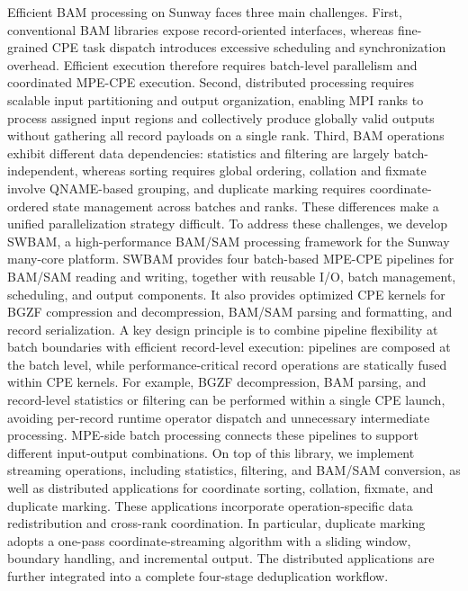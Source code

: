 \documentclass[lettersize,journal]{IEEEtran}
\begin{document}
Efficient BAM processing on Sunway faces three main challenges.
First, conventional BAM libraries expose record-oriented interfaces, whereas fine-grained CPE task dispatch introduces excessive scheduling and synchronization overhead. Efficient execution therefore requires batch-level parallelism and coordinated MPE-CPE execution.
Second, distributed processing requires scalable input partitioning and output organization, enabling MPI ranks to process assigned input regions and collectively produce globally valid outputs without gathering all record payloads on a single rank.
Third, BAM operations exhibit different data dependencies: statistics and filtering are largely batch-independent, whereas sorting requires global ordering, collation and fixmate involve QNAME-based grouping, and duplicate marking requires coordinate-ordered state management across batches and ranks.
These differences make a unified parallelization strategy difficult.
To address these challenges, we develop SWBAM, a high-performance BAM/SAM processing framework for the Sunway many-core platform.
SWBAM provides four batch-based MPE-CPE pipelines for BAM/SAM reading and writing, together with reusable I/O, batch management, scheduling, and output components.
It also provides optimized CPE kernels for BGZF compression and decompression, BAM/SAM parsing and formatting, and record serialization.
A key design principle is to combine pipeline flexibility at batch boundaries with efficient record-level execution: pipelines are composed at the batch level, while performance-critical record operations are statically fused within CPE kernels.
For example, BGZF decompression, BAM parsing, and record-level statistics or filtering can be performed within a single CPE launch, avoiding per-record runtime operator dispatch and unnecessary intermediate processing.
MPE-side batch processing connects these pipelines to support different input-output combinations.
On top of this library, we implement streaming operations, including statistics, filtering, and BAM/SAM conversion, as well as distributed applications for coordinate sorting, collation, fixmate, and duplicate marking.
These applications incorporate operation-specific data redistribution and cross-rank coordination.
In particular, duplicate marking adopts a one-pass coordinate-streaming algorithm with a sliding window, boundary handling, and incremental output.
The distributed applications are further integrated into a complete four-stage deduplication workflow.
\end{document}
